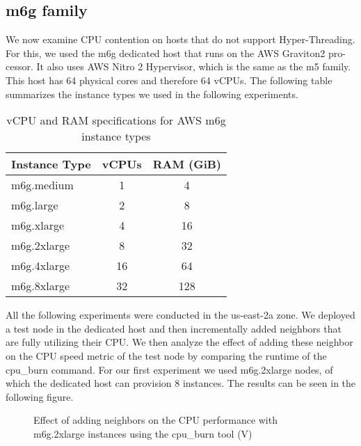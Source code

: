 \subsection{m6g family}
We now examine CPU contention on hosts that do not support Hyper-Threading.
For this, we used the m6g dedicated host that runs on the AWS Graviton2 pro-
cessor. It also uses AWS Nitro 2 Hypervisor, which is the same as the m5 family. This host has 
64 physical cores and therefore 64 vCPUs. The following table summarizes the instance types 
we used in the following experiments.
\begin{table}[H]
\centering
\begin{tabular}{|l|c|c|}
\hline
\textbf{Instance Type} & \textbf{vCPUs} & \textbf{RAM (GiB)} \\
\hline
m6g.medium   & 1  & 4   \\
m6g.large    & 2  & 8   \\
m6g.xlarge   & 4  & 16  \\
m6g.2xlarge  & 8  & 32  \\
m6g.4xlarge  & 16 & 64  \\
m6g.8xlarge  & 32 & 128 \\
\hline
\end{tabular}
\caption{vCPU and RAM specifications for AWS m6g instance types}
\label{tab:m6g_specs}
\end{table}
\noindent
All the following experiments were conducted in the us-east-2a zone. We deployed a test node in 
the dedicated host and then incrementally added neighbors that are fully utilizing their
CPU. We then analyze the effect of adding these neighbor on the CPU speed
metric of the test node by comparing the runtime of the cpu\_burn command. For our first experiment 
we used m6g.2xlarge nodes, of which the dedicated host can provision 8 instances. The results 
can be seen in the following figure. 
\begin{figure}[H]
\centering
{}
\caption{Effect of adding neighbors on the CPU performance with m6g.2xlarge instances using the cpu\_burn tool (V)}
\end{figure}
